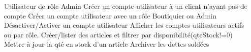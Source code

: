 Utilisateur de rôle Admin
Créer un compte utilisateur à un client n’ayant pas de compte
Créer un compte utilisateur avec un rôle Boutiquier ou  Admin
Désactiver/Activer  un compte utilisateur  
Afficher les comptes utilisateurs  actifs ou par rôle.
Créer/lister  des articles et filtrer par disponibilité(qteStock!=0) 
Mettre à jour la qté en stock d’un article
Archiver les dettes soldées
